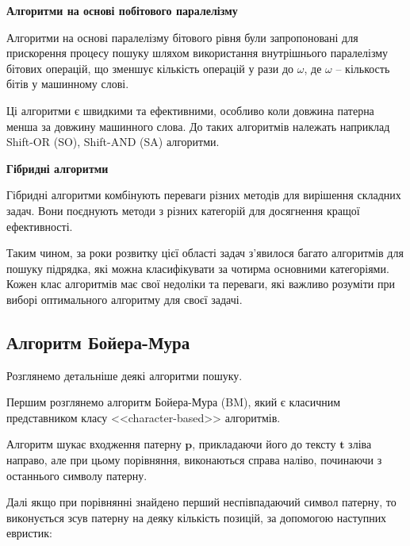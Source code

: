\documentclass[a4paper,14pt]{extarticle} %
\begin{document}
\textbf{Алгоритми на основі побітового паралелізму}

Алгоритми на основі паралелізму бітового рівня були запропоновані для прискорення процесу пошуку шляхом використання внутрішнього паралелізму бітових операцій, що зменшує кількість операцій у рази до $\omega$, де $\omega$ –  кількость бітів у машинному слові.

Ці алгоритми є швидкими та ефективними, особливо коли довжина патерна менша за довжину машинного слова. До таких алгоритмів належать наприклад Shift-OR (SO), Shift-AND (SA) алгоритми.

\textbf{Гібридні алгоритми}

Гібридні алгоритми комбінують переваги різних методів для вирішення складних задач. Вони поєднують методи з різних категорій для досягнення кращої ефективності.

Таким чином, за роки розвитку цієї області задач з'явилося багато алгоритмів для пошуку підрядка, які можна класифікувати за чотирма основними категоріями. Кожен клас алгоритмів має свої недоліки та переваги, які важливо розуміти при виборі оптимального алгоритму для своєї задачі.

\subsection{Алгоритм Бойера-Мура}
Розглянемо детальніше деякі алгоритми пошуку.

Першим розглянемо алгоритм Бойера-Мура (BM), який є класичним представником класу <<character-based>> алгоритмів.

Алгоритм шукає входження патерну $\textbf{p}$, прикладаючи його до тексту $\textbf{t}$ зліва направо, але при цьому порівняння, виконаються справа наліво, починаючи з останнього символу патерну.

Далі якщо при порівнянні знайдено перший неспівпадаючий символ патерну, то виконується зсув патерну на деяку кількість позицій, за допомогою наступних евристик:
\end{document}
